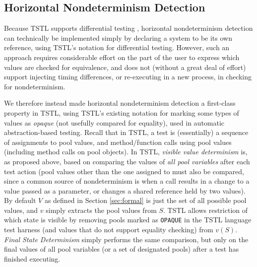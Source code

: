 \begin{comment}
\end{comment}

\subsection{Horizontal Nondeterminism Detection}
\label{sec:horizimp}

Because TSTL supports differential testing \cite{tstlsttt}, horizontal
nondeterminism detection can technically be implemented simply by
declaring a system to be its own reference, using TSTL's notation for
differential testing.  However, such an approach requires considerable effort
on the part of the user to express which values are checked for
equivalence, and does not (without a great deal of effort) support injecting timing differences,
or re-executing in a new process, in checking for nondeterminism.

We therefore instead made horizontal nondeterminism detection a first-class
property in TSTL, using TSTL's existing notation for marking some
types of values as \emph{opaque} (not usefully compared for equality),
used in automatic abstraction-based testing.  Recall that in TSTL, a
test is (essentially) a sequence of assignments to pool values,
and method/function calls using pool values (including method calls on
pool objects).  In TSTL, \emph{visible
value determinism} is, as proposed above, based on comparing the values of \emph{all pool
variables} after each test action (pool values other than the one
assigned to must also be compared, since a common source of
nondeterminism is when a call results in a change to a value passed as
a parameter, or changes a shared reference held by two values).  By
default $V$ as defined in Section \ref{sec:formal} is just the set of all possible pool values, and $v$
simply extracts the pool values from $S$.
TSTL allows restriction of which state is visible by removing pools marked as {\tt OPAQUE} in the
TSTL language test harness (and values that do not support equality
checking) from $v(S)$.  \emph{Final State Determinism} simply performs the same
comparison, but only on the final values of all pool variables (or a
set of designated pools) after a test has
finished executing.

